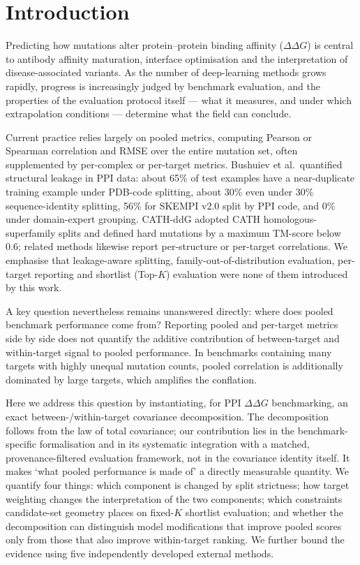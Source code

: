 \documentclass[11pt,a4paper]{article}
\begin{document}
\section{Introduction}
Predicting how mutations alter protein--protein binding affinity ($\Delta\Delta G$) is
central to antibody affinity maturation, interface optimisation and the interpretation of
disease-associated variants. As the number of deep-learning methods grows rapidly, progress
is increasingly judged by benchmark evaluation, and the properties of the evaluation
protocol itself --- what it measures, and under which extrapolation conditions --- determine
what the field can conclude.

Current practice relies largely on pooled metrics, computing Pearson or Spearman correlation
and RMSE over the entire mutation set\cite{biometry}, often supplemented by per-complex
or per-target metrics. Bushuiev et al.\ quantified structural leakage in PPI data: about
65\% of test examples have a near-duplicate training example under PDB-code splitting, about
30\% even under 30\% sequence-identity splitting, 56\% for SKEMPI
v2.0\cite{skempi2} split by PPI code, and 0\% under domain-expert
grouping\cite{leakage}. CATH-ddG adopted CATH homologous-superfamily splits and defined
hard mutations by a maximum TM-score below 0.6\cite{cathddg}; related methods likewise
report per-structure or per-target correlations\cite{ddgpred,prefolddg,ppiminer}. We emphasise that
leakage-aware splitting, family-out-of-distribution evaluation, per-target reporting and
shortlist (Top-$K$) evaluation were none of them introduced by this work.

A key question nevertheless remains unanswered directly: where does pooled benchmark
performance come from? Reporting pooled and per-target metrics side by side does not
quantify the additive contribution of between-target and within-target signal to pooled
performance. In benchmarks containing many targets with highly unequal mutation counts,
pooled correlation is additionally dominated by large targets, which amplifies the
conflation.

Here we address this question by instantiating, for PPI $\Delta\Delta G$ benchmarking, an
exact between-/within-target covariance decomposition. The decomposition follows from the
law of total covariance; our contribution lies in the benchmark-specific formalisation and
in its systematic integration with a matched, provenance-filtered evaluation framework, not
in the covariance identity itself. It makes `what pooled performance is made of' a directly
measurable quantity. We quantify four things: which component is changed by split
strictness; how target weighting changes the interpretation of the two components; which
constraints candidate-set geometry places on fixed-$K$ shortlist evaluation; and whether
the decomposition can distinguish model modifications that improve pooled scores only from
those that also improve within-target ranking. We further bound the evidence using five
independently developed external methods.
\end{document}
